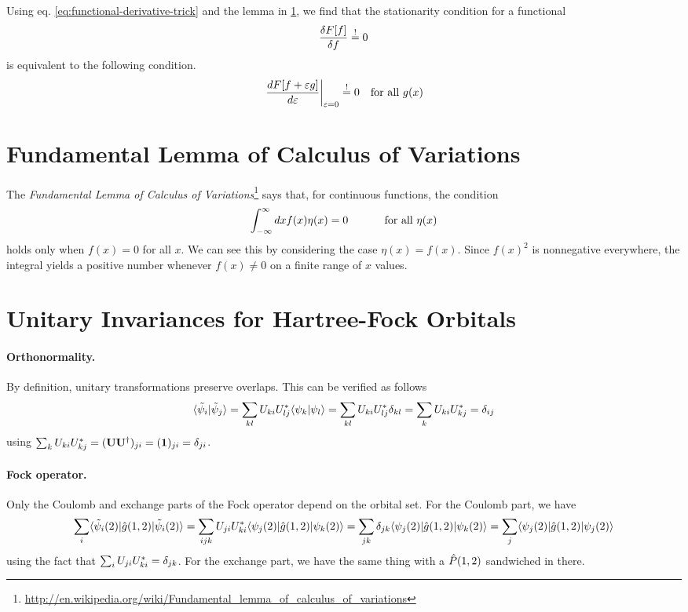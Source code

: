 \documentclass[11pt]{article}
\numberwithin{equation}{section}
\begin{document}
Using eq. \ref{eq:functional-derivative-trick} and the lemma in \cref{app:fundamental-lemma-of-calculus-of-variations}, we find that the stationarity condition for a functional
\begin{align}
  \fr{\d F[f]}{\d f}
\overset{!}{=}
  0
\end{align}
is equivalent to the following condition.
\begin{align}
  \left.
  \fd{F[f+\e g]}{\e}
  \right|_{\e=0}
\overset{!}{=}
  0
&&
  \text{for all $g(x)$}
\end{align}


\newpage
\section{Fundamental Lemma of Calculus of Variations}\label{app:fundamental-lemma-of-calculus-of-variations}
The \textit{Fundamental Lemma of Calculus of Variations}\footnote{\url{http://en.wikipedia.org/wiki/Fundamental_lemma_of_calculus_of_variations}} says that, for continuous functions, the condition
\begin{align}
  \int_{-\infty}^\infty dx f(x)\eta(x)
=
  0
\sp\text{ for all $\eta(x)$}
\end{align}
holds only when $f(x)=0$ for all $x$.
We can see this by considering the case $\eta(x)=f(x)$.
Since $f(x)^2$ is nonnegative everywhere, the integral yields a positive number whenever $f(x)\neq 0$ on a finite range of $x$ values.



\newpage
\section{Unitary Invariances for Hartree-Fock Orbitals}\label{app:hartree-fock-orbital-invariance}

\paragraph{Orthonormality.}
By definition, unitary transformations preserve overlaps.
This can be verified as follows
\begin{align*}
  \ip{\tl\y_i|\tl\y_j}
=
\sum_{kl}
  U_{ki}U_{lj}^*
  \ip{\y_k|\y_l}
=
\sum_{kl}
  U_{ki}U_{lj}^*
  \d_{kl}
=
\sum_k
  U_{ki}U_{kj}^*
=
  \d_{ij}
\end{align*}
using $\sum_k U_{ki}U_{kj}^*=(\bo{U}\bo{U}\dg)_{ji}=(\bo{1})_{ji}=\d_{ji}$.

\paragraph{Fock operator.}
Only the Coulomb and exchange parts of the Fock operator depend on the orbital set.
For the Coulomb part, we have
{\small\begin{align*}
\sum_i
  \ip{\tl\y_i(2)|\op{g}(1,2)|\tl\y_i(2)}
=
\sum_{ijk}
  U_{ji}U_{ki}^*
  \ip{\y_j(2)|\op{g}(1,2)|\y_k(2)}
=
\sum_{jk}
  \d_{jk}
  \ip{\y_j(2)|\op{g}(1,2)|\y_k(2)}
=
\sum_j
  \ip{\y_j(2)|\op{g}(1,2)|\y_j(2)}
\end{align*} \underline{}}%
using the fact that $\sum_i U_{ji}U_{ki}^*=\d_{jk}$.
For the exchange part, we have the same thing with a $\op{P}(1,2)$ sandwiched in there.
\end{document}
